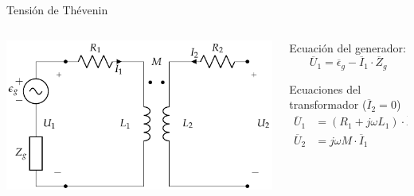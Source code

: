 \documentclass[aspectratio=169, usenames,svgnames,dvipsnames]{beamer}
\begin{document}
\begin{frame}[label={sec:orgfd64530}]{Tensión de Thévenin}
\begin{columns}
\begin{column}{0.5\columnwidth}
\begin{center}
\includegraphics[height=0.5\textheight]{../figs/Trafo_Real_FuentePrimario.pdf}
\end{center}
\end{column}
\begin{column}{0.5\columnwidth}
Ecuación del generador:
\[
  \overline{U}_1 = \overline{\epsilon}_g - \overline{I}_1 \cdot \overline{Z}_g
\]

Ecuaciones del transformador (\(\overline{I}_2 = 0\))
\begin{align*}
  \overline{U}_1 &= (R_1 + j \omega L_1) \cdot \overline{I}_1\\
  \overline{U}_2 &= j \omega M \cdot \overline{I}_1
\end{align*}
\end{column}
\end{columns}
\end{frame}
\end{document}
